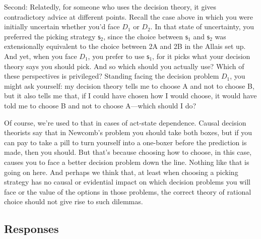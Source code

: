 \documentclass[a4paper]{article}
\newcommand\s{\mathsf{s}}
\newcommand{\todoinfo}[2][]{\todo[backgroundcolor=orange!80,bordercolor=black,linecolor=gray!80, #1,inline,caption={}]{#2}}
\newenvironment{CCM rewritten}
{\begingroup\color{blue}} %
{\endgroup}              %
\begin{document}
{Second: Relatedly, for someone who uses the decision theory, it gives contradictory advice at different points. Recall the case above in which you were initially uncertain whether you'd face $D_1$ or $D_2$. In that state of uncertainty, you preferred the picking strategy $\s_2$, since the choice between $\s_1$ and $\s_2$ was extensionally equivalent to the choice between 2A and 2B in the Allais set up. And yet, when you face $D_1$, you prefer to use $\s_1$, for it picks what your decision theory says you should pick. And so which should you actually use? Which of these perspectives is privileged? Standing facing the decision problem $D_1$, you might ask yourself: my decision theory tells me to choose A and not to choose B, but it also tells me that, if I could have chosen how I would choose, it would have told me to choose B and not to choose A---which should I do?

Of course, we're used to that in cases of act-state dependence. Causal decision theorists say that in Newcomb's problem you should take both boxes, but if you can pay to take a pill to turn yourself into a one-boxer before the prediction is made, then you should. But that's because choosing how to choose, in this case, causes you to face a better decision problem down the line. Nothing like that is going on here. And perhaps we think that, at least when choosing a picking strategy has no causal or evidential impact on which decision problems you will face or the value of the options in those problems, the correct theory of rational choice should not give rise to such dilemmas.}




\subsection{Responses}
\end{document}
